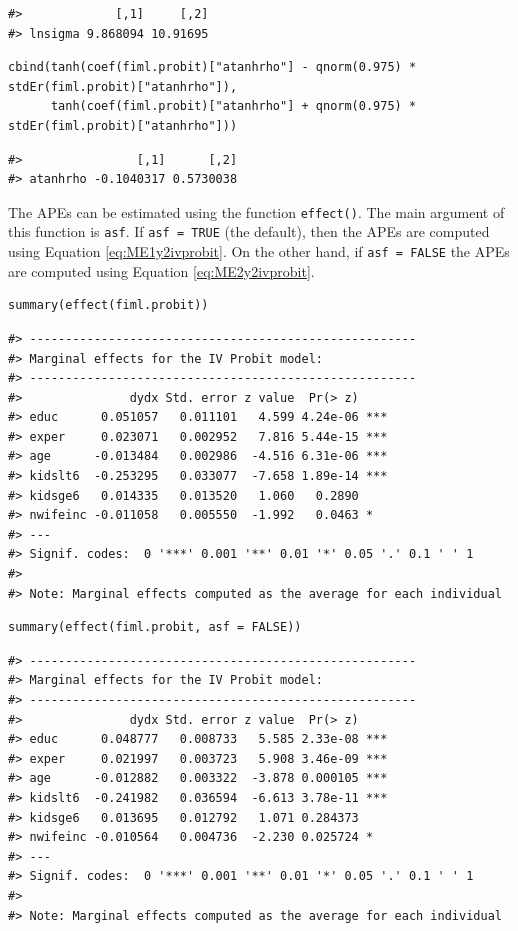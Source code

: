 \begin{verbatim}
#>             [,1]     [,2]
#> lnsigma 9.868094 10.91695
\end{verbatim}

\begin{verbatim}
cbind(tanh(coef(fiml.probit)["atanhrho"] - qnorm(0.975) * stdEr(fiml.probit)["atanhrho"]), 
      tanh(coef(fiml.probit)["atanhrho"] + qnorm(0.975) * stdEr(fiml.probit)["atanhrho"]))
\end{verbatim}

\begin{verbatim}
#>                [,1]      [,2]
#> atanhrho -0.1040317 0.5730038
\end{verbatim}

The APEs can be estimated using the function \texttt{effect()}. The main argument of this function is \texttt{asf}. If \texttt{asf\ =\ TRUE} (the default), then the APEs are computed using Equation \eqref{eq:ME1y2ivprobit}. On the other hand, if \texttt{asf\ =\ FALSE} the APEs are computed using Equation \eqref{eq:ME2y2ivprobit}.

\begin{verbatim}
summary(effect(fiml.probit))
\end{verbatim}

\begin{verbatim}
#> ------------------------------------------------------
#> Marginal effects for the IV Probit model:
#> ------------------------------------------------------
#>               dydx Std. error z value  Pr(> z)    
#> educ      0.051057   0.011101   4.599 4.24e-06 ***
#> exper     0.023071   0.002952   7.816 5.44e-15 ***
#> age      -0.013484   0.002986  -4.516 6.31e-06 ***
#> kidslt6  -0.253295   0.033077  -7.658 1.89e-14 ***
#> kidsge6   0.014335   0.013520   1.060   0.2890    
#> nwifeinc -0.011058   0.005550  -1.992   0.0463 *  
#> ---
#> Signif. codes:  0 '***' 0.001 '**' 0.01 '*' 0.05 '.' 0.1 ' ' 1
#> 
#> Note: Marginal effects computed as the average for each individual
\end{verbatim}

\begin{verbatim}
summary(effect(fiml.probit, asf = FALSE))
\end{verbatim}

\begin{verbatim}
#> ------------------------------------------------------
#> Marginal effects for the IV Probit model:
#> ------------------------------------------------------
#>               dydx Std. error z value  Pr(> z)    
#> educ      0.048777   0.008733   5.585 2.33e-08 ***
#> exper     0.021997   0.003723   5.908 3.46e-09 ***
#> age      -0.012882   0.003322  -3.878 0.000105 ***
#> kidslt6  -0.241982   0.036594  -6.613 3.78e-11 ***
#> kidsge6   0.013695   0.012792   1.071 0.284373    
#> nwifeinc -0.010564   0.004736  -2.230 0.025724 *  
#> ---
#> Signif. codes:  0 '***' 0.001 '**' 0.01 '*' 0.05 '.' 0.1 ' ' 1
#> 
#> Note: Marginal effects computed as the average for each individual
\end{verbatim}

